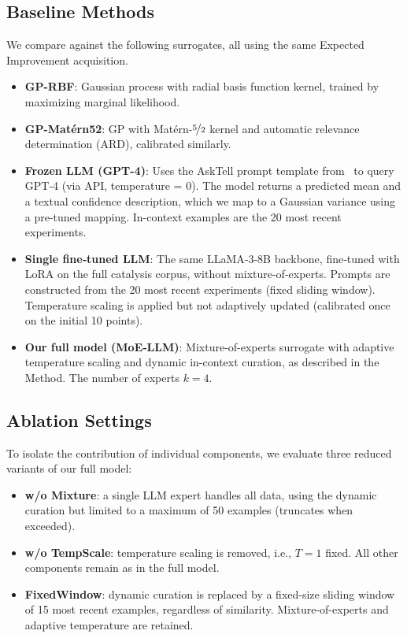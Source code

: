 \documentclass{article}
\begin{document}
\subsection{Baseline Methods}
We compare against the following surrogates, all using the same Expected Improvement acquisition.
\begin{itemize}
    \item \textbf{GP-RBF}: Gaussian process with radial basis function kernel, trained by maximizing marginal likelihood.
    \item \textbf{GP-Matérn52}: GP with Matérn-\(\nicefrac{5}{2}\) kernel and automatic relevance determination (ARD), calibrated similarly.
    \item \textbf{Frozen LLM (GPT-4)}: Uses the AskTell prompt template from~\cite{...} to query GPT‑4 (via API, temperature = 0). The model returns a predicted mean and a textual confidence description, which we map to a Gaussian variance using a pre-tuned mapping. In-context examples are the 20 most recent experiments.
    \item \textbf{Single fine‑tuned LLM}: The same LLaMA‑3‑8B backbone, fine‑tuned with LoRA on the full catalysis corpus, without mixture-of-experts. Prompts are constructed from the 20 most recent experiments (fixed sliding window). Temperature scaling is applied but not adaptively updated (calibrated once on the initial 10 points).
    \item \textbf{Our full model (MoE‑LLM)}: Mixture-of-experts surrogate with adaptive temperature scaling and dynamic in-context curation, as described in the Method. The number of experts \(k=4\).
\end{itemize}

\subsection{Ablation Settings}
To isolate the contribution of individual components, we evaluate three reduced variants of our full model:
\begin{itemize}
    \item \textbf{w/o Mixture}: a single LLM expert handles all data, using the dynamic curation but limited to a maximum of 50 examples (truncates when exceeded).
    \item \textbf{w/o TempScale}: temperature scaling is removed, i.e., \(T=1\) fixed. All other components remain as in the full model.
    \item \textbf{FixedWindow}: dynamic curation is replaced by a fixed-size sliding window of 15 most recent examples, regardless of similarity. Mixture-of-experts and adaptive temperature are retained.
\end{itemize}
\end{document}
